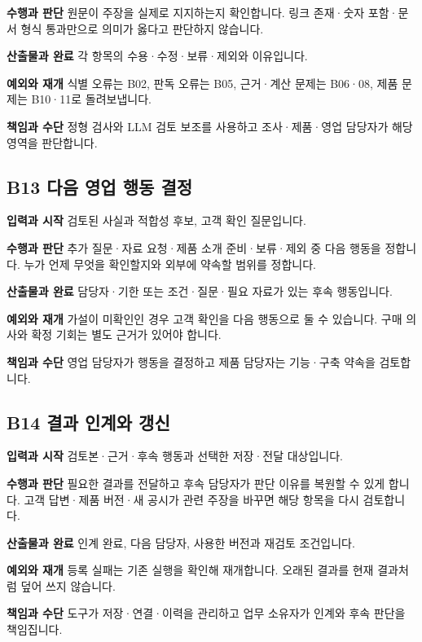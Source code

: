 \documentclass[a4paper,10pt]{article}
\begin{document}
\noindent\textbf{수행과 판단} 원문이 주장을 실제로 지지하는지 확인합니다. 링크 존재·숫자 포함·문서 형식 통과만으로 의미가 옳다고 판단하지 않습니다.


\noindent\textbf{산출물과 완료} 각 항목의 수용·수정·보류·제외와 이유입니다.


\noindent\textbf{예외와 재개} 식별 오류는 B02, 판독 오류는 B05, 근거·계산 문제는 B06·08, 제품 문제는 B10·11로 돌려보냅니다.


\noindent\textbf{책임과 수단} 정형 검사와 LLM 검토 보조를 사용하고 조사·제품·영업 담당자가 해당 영역을 판단합니다.


\endgroup
\begingroup\setlength{\parskip}{3pt}
\subsection*{B13 다음 영업 행동 결정}
\noindent\textbf{입력과 시작} 검토된 사실과 적합성 후보, 고객 확인 질문입니다.


\noindent\textbf{수행과 판단} 추가 질문·자료 요청·제품 소개 준비·보류·제외 중 다음 행동을 정합니다. 누가 언제 무엇을 확인할지와 외부에 약속할 범위를 정합니다.


\noindent\textbf{산출물과 완료} 담당자·기한 또는 조건·질문·필요 자료가 있는 후속 행동입니다.


\noindent\textbf{예외와 재개} 가설이 미확인인 경우 고객 확인을 다음 행동으로 둘 수 있습니다. 구매 의사와 확정 기회는 별도 근거가 있어야 합니다.


\noindent\textbf{책임과 수단} 영업 담당자가 행동을 결정하고 제품 담당자는 기능·구축 약속을 검토합니다.


\endgroup
\begingroup\setlength{\parskip}{3pt}
\subsection*{B14 결과 인계와 갱신}
\noindent\textbf{입력과 시작} 검토본·근거·후속 행동과 선택한 저장·전달 대상입니다.


\noindent\textbf{수행과 판단} 필요한 결과를 전달하고 후속 담당자가 판단 이유를 복원할 수 있게 합니다. 고객 답변·제품 버전·새 공시가 관련 주장을 바꾸면 해당 항목을 다시 검토합니다.


\noindent\textbf{산출물과 완료} 인계 완료, 다음 담당자, 사용한 버전과 재검토 조건입니다.


\noindent\textbf{예외와 재개} 등록 실패는 기존 실행을 확인해 재개합니다. 오래된 결과를 현재 결과처럼 덮어 쓰지 않습니다.


\noindent\textbf{책임과 수단} 도구가 저장·연결·이력을 관리하고 업무 소유자가 인계와 후속 판단을 책임집니다.
\end{document}
